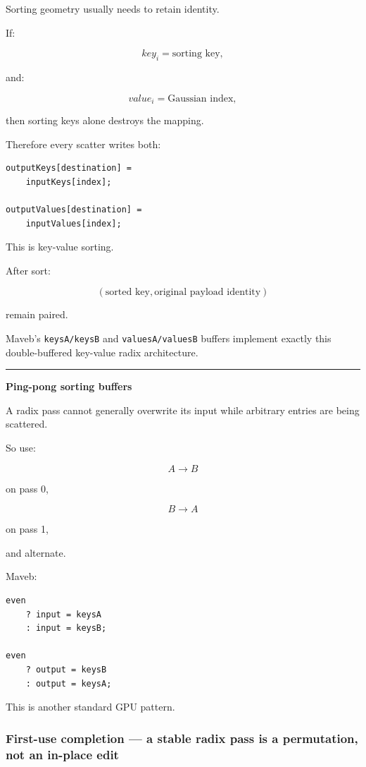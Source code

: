 Sorting geometry usually needs to retain identity.

If:

\[
key_i=\text{sorting key},
\]

and:

\[
value_i=\text{Gaussian index},
\]

then sorting keys alone destroys the mapping.

Therefore every scatter writes both:

\protect{}\label{oxmxax}%
\begin{verbatim}
outputKeys[destination] =
    inputKeys[index];

outputValues[destination] =
    inputValues[index];
\end{verbatim}

This is key-value sorting.

After sort:

\[
\boxed{
(\text{sorted key},\text{original payload identity})
}
\]

remain paired.

Maveb's \texttt{keysA/keysB} and \texttt{valuesA/valuesB} buffers implement exactly this double-buffered key-value radix architecture.

\begin{center}\rule{0.5\linewidth}{0.5pt}\end{center}

\textbf{Ping-pong sorting buffers}

A radix pass cannot generally overwrite its input while arbitrary entries are being scattered.

So use:

\[
A\rightarrow B
\]

on pass 0,

\[
B\rightarrow A
\]

on pass 1,

and alternate.

Maveb:

\protect{}\label{w6g26n}%
\begin{verbatim}
even
    ? input = keysA
    : input = keysB;

even
    ? output = keysB
    : output = keysA;
\end{verbatim}

This is another standard GPU pattern.

\subsubsection{First-use completion --- a stable radix pass is a permutation, not an in-place edit}\label{01-foundations-i-ch009-first-use-completion-a-stable-radix-pass-is-a-permutation-not-an-in-place-edit}

